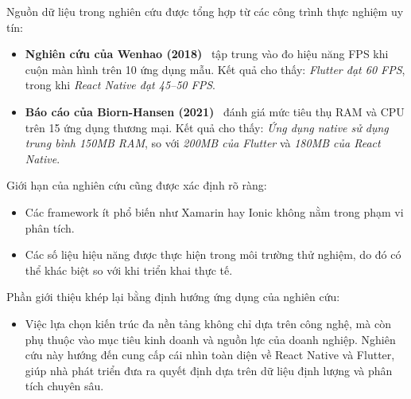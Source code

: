     \hspace*{0.8cm}Nguồn dữ liệu trong nghiên cứu được tổng hợp từ các công trình thực nghiệm uy tín:
    \setlength{\leftmargini}{1.0cm}
    \begin{itemize}
        \item \textbf{Nghiên cứu của Wenhao (2018)}~\cite{wenhao2018} tập trung vào đo hiệu năng FPS khi cuộn màn hình trên 10 ứng dụng mẫu. Kết quả cho thấy: \textit{Flutter đạt 60 FPS}, trong khi \textit{React Native đạt 45–50 FPS}.
        \item \textbf{Báo cáo của Biorn-Hansen (2021)}~\cite{biornhansen2021} đánh giá mức tiêu thụ RAM và CPU trên 15 ứng dụng thương mại. Kết quả cho thấy: \textit{Ứng dụng native sử dụng trung bình 150MB RAM}, so với \textit{200MB của Flutter} và \textit{180MB của React Native}.
    \end{itemize}
\vspace{0.5em}


    \hspace*{0.8cm}Giới hạn của nghiên cứu cũng được xác định rõ ràng:
    \setlength{\leftmargini}{1.0cm}
    \begin{itemize}
        \item Các framework ít phổ biến như Xamarin hay Ionic không nằm trong phạm vi phân tích.
        \item Các số liệu hiệu năng được thực hiện trong môi trường thử nghiệm, do đó có thể khác biệt so với khi triển khai thực tế.
    \end{itemize}
\vspace{0.5em}


    \hspace*{0.8cm}Phần giới thiệu khép lại bằng định hướng ứng dụng của nghiên cứu:
    \setlength{\leftmargini}{1.0cm}
    \begin{itemize}
        \item Việc lựa chọn kiến trúc đa nền tảng không chỉ dựa trên công nghệ, mà còn phụ thuộc vào mục tiêu kinh doanh và nguồn lực của doanh nghiệp. Nghiên cứu này hướng đến cung cấp cái nhìn toàn diện về React Native và Flutter, giúp nhà phát triển đưa ra quyết định dựa trên dữ liệu định lượng và phân tích chuyên sâu.
    \end{itemize}
\vspace{0.5em}
